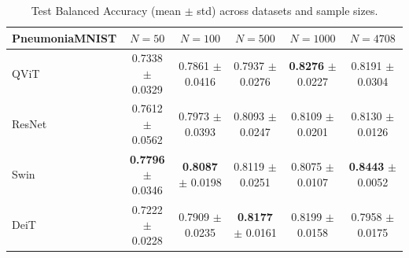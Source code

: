 \begin{table}[htbp]
\centering
\caption{Test Balanced Accuracy (mean $\pm$ std) across datasets and sample sizes.}
\label{tab:test_balacc}
\begin{tabular}{lccccc}
\toprule
\textbf{PneumoniaMNIST} & $N = 50$ & $N = 100$ & $N = 500$ & $N = 1000$ & $N = 4708$ \\
\midrule
QViT & 0.7338 $\pm$ 0.0329 & 0.7861 $\pm$ 0.0416 & 0.7937 $\pm$ 0.0276 & \textbf{0.8276} $\pm$ 0.0227 & 0.8191 $\pm$ 0.0304 \\
ResNet & 0.7612 $\pm$ 0.0562 & 0.7973 $\pm$ 0.0393 & 0.8093 $\pm$ 0.0247 & 0.8109 $\pm$ 0.0201 & 0.8130 $\pm$ 0.0126 \\
Swin & \textbf{0.7796} $\pm$ 0.0346 & \textbf{0.8087} $\pm$ 0.0198 & 0.8119 $\pm$ 0.0251 & 0.8075 $\pm$ 0.0107 & \textbf{0.8443} $\pm$ 0.0052 \\
DeiT & 0.7222 $\pm$ 0.0228 & 0.7909 $\pm$ 0.0235 & \textbf{0.8177} $\pm$ 0.0161 & 0.8199 $\pm$ 0.0158 & 0.7958 $\pm$ 0.0175 \\
\bottomrule
\end{tabular}
\end{table}
